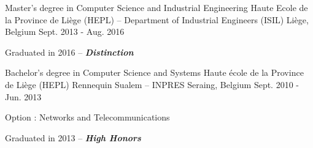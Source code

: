 
\begin{cventries}

  \cventry
    {Master's degree in Computer Science and Industrial Engineering} %
    {Haute Ecole de la Province de Liège (HEPL) -- Department of Industrial Engineers (ISIL)} %
    {Liège, Belgium} %
    {Sept. 2013 - Aug. 2016} %
    {
      \begin{cvitems} %
        \item{Graduated in 2016 -- \textbf{\textit{Distinction}}}
      \end{cvitems}
    }

  \cventry
    {Bachelor's degree in Computer Science and Systems} %
    {Haute école de la Province de Liège (HEPL) Rennequin Sualem -- INPRES} %
    {Seraing, Belgium} %
    {Sept. 2010 - Jun. 2013} %
    {
      \begin{cvitems} %
        \item{Option : Networks and Telecommunications}
        \item{Graduated in 2013 -- \textbf{\textit{High Honors}}}
      \end{cvitems}
    }




\end{cventries}

